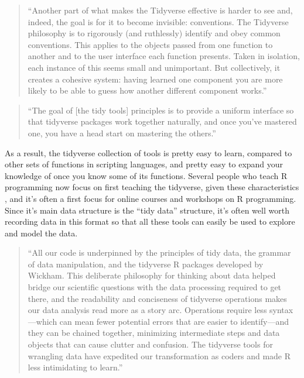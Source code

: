 \documentclass[]{tufte-book}
\begin{document}
\begin{quote}
``Another part of what makes the Tidyverse effective is harder to see and,
indeed, the goal is for it to become invisible: conventions. The Tidyverse
philosophy is to rigorously (and ruthlessly) identify and obey common
conventions. This applies to the objects passed from one function to another
and to the user interface each function presents. Taken in isolation, each
instance of this seems small and unimportant. But collectively, it creates
a cohesive system: having learned one component you are more likely to be
able to guess how another different component works.'' \citep{bryan2017data}
\end{quote}

\begin{quote}
``The goal of {[}the tidy tools{]} principles is to provide a uniform interface so
that tidyverse packages work together naturally, and once you've mastered one,
you have a head start on mastering the others.'' \citep{wickhem2017tidy}
\end{quote}

As a result, the tidyverse collection of tools is pretty easy to learn, compared
to other sets of functions in scripting languages, and pretty easy to expand
your knowledge of once you know some of its functions. Several people who teach
R programming now focus on first teaching the tidyverse, given these
characteristics \citep{robinson2017teach, peng2018teaching}, and it's often a
first focus for online courses and workshops on R programming. Since it's main
data structure is the ``tidy data'' structure, it's often well worth recording
data in this format so that all these tools can easily be used to explore and
model the data.

\begin{quote}
``All our code is underpinned by the principles of tidy data, the
grammar of data manipulation, and the tidyverse R packages developed
by Wickham. This deliberate philosophy for thinking
about data helped bridge our scientific questions with the data processing
required to get there, and the readability and conciseness of
tidyverse operations makes our data analysis read more as a story
arc. Operations require less syntax---which can mean fewer potential
errors that are easier to identify---and they can be chained together,
minimizing intermediate steps and data objects that can cause clutter and
confusion. The tidyverse tools for wrangling data have
expedited our transformation as coders and made R less intimidating to
learn.'' \citep{lowndes2017our}
\end{quote}
\end{document}
